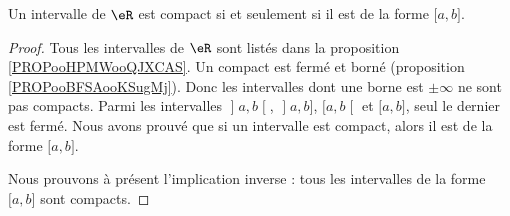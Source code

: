 \begin{theorem}   \label{ThoBOrelLebesgue}
	Un intervalle de \( \eR\) est compact si et seulement si il est de la forme \( \mathopen[ a , b \mathclose]\).
\end{theorem}

\begin{proof}
	Tous les intervalles de \( \eR\) sont listés dans la proposition \ref{PROPooHPMWooQJXCAS}. Un compact est fermé et borné (proposition \ref{PROPooBFSAooKSugMj}). Donc les intervalles dont une borne est \( \pm\infty\) ne sont pas compacts. Parmi les intervalles \( \mathopen] a , b \mathclose[\), \( \mathopen] a , b \mathclose]\), \( \mathopen[ a , b \mathclose[\) et \( \mathopen[ a , b \mathclose]\), seul le dernier est fermé. Nous avons prouvé que si un intervalle est compact, alors il est de la forme \( \mathopen[ a , b \mathclose]\).

	Nous prouvons à présent l'implication inverse : tous les intervalles de la forme \( \mathopen[ a , b \mathclose]\) sont compacts.


\end{proof}
